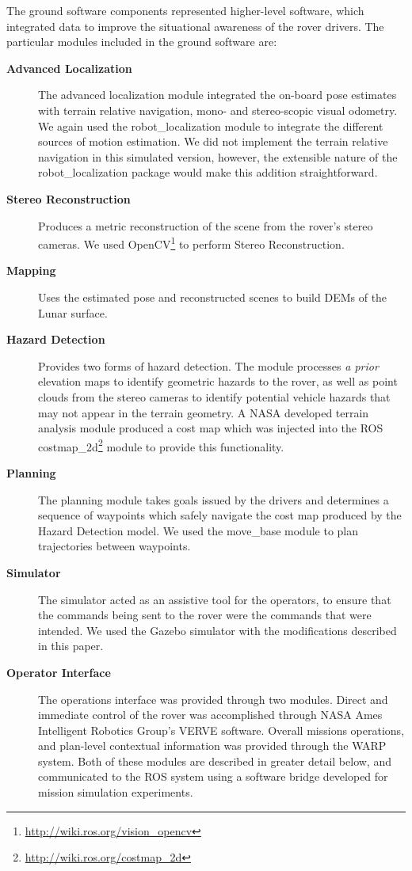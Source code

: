 \documentclass[twocolumn,letterpaper]{IEEEAerospaceCLS}  %
\begin{document}
The ground software components represented higher-level software, which integrated data to improve the situational awareness of the rover drivers.  
The particular modules included in the ground software are:

\begin{description}
\item[\textbf{Advanced Localization}]  The advanced localization module integrated the on-board pose estimates with terrain relative navigation, mono- and stereo-scopic visual odometry.  We again used the robot\_localization module to integrate the different sources of motion estimation.  We did not implement the terrain relative navigation in this simulated version, however, the extensible nature of the robot\_localization package would make this addition straightforward.
\item[\textbf{Stereo Reconstruction}] Produces a metric reconstruction of the scene from the rover's stereo cameras.  We used OpenCV\footnote{\url{http://wiki.ros.org/vision_opencv}} to perform Stereo Reconstruction.
\item[\textbf{Mapping}] Uses the estimated pose and reconstructed scenes to build DEMs of the Lunar surface.  %
\item[\textbf{Hazard Detection}] Provides two forms of hazard detection.  The module processes \emph{a prior} elevation maps to identify geometric hazards to the rover, as well as point clouds from the stereo cameras to identify potential vehicle hazards that may not appear in the terrain geometry.  A NASA developed terrain analysis module produced a cost map which was injected into the ROS costmap\_2d\footnote{\url{http://wiki.ros.org/costmap_2d}} module to provide this functionality.  
\item[\textbf{Planning}]  The planning module takes goals issued by the drivers and determines a sequence of waypoints which safely navigate the cost map produced by the Hazard Detection model.  We used the move\_base module to plan trajectories between waypoints.  
\item[\textbf{Simulator}]  The simulator acted as an assistive tool for the operators, to ensure that the commands being sent to the rover were the commands that were intended.  We used the Gazebo simulator with the modifications described in this paper.  
\item[\textbf{Operator Interface}]  The operations interface was provided through two modules.  Direct and immediate control of the rover was accomplished through NASA Ames Intelligent Robotics Group's VERVE software.  Overall missions operations, and plan-level contextual information was provided through the WARP system.  Both of these modules are described in greater detail below, and communicated to the ROS system using a software bridge developed for mission simulation experiments.
\end{description}
\end{document}
